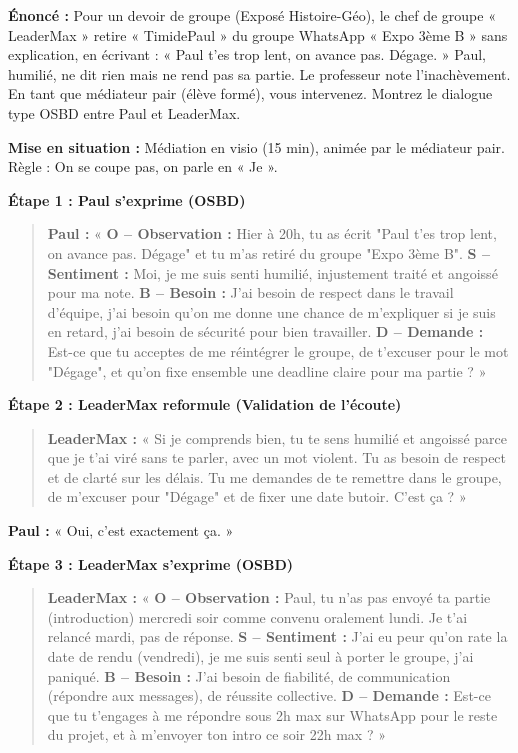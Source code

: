 \documentclass[11pt]{article}
\begin{document}
\begin{exoresolu}
\textbf{Énoncé :} Pour un devoir de groupe (Exposé Histoire-Géo), le chef de groupe « LeaderMax » retire « TimidePaul » du groupe WhatsApp « Expo 3ème B » sans explication, en écrivant : « Paul t'es trop lent, on avance pas. Dégage. » Paul, humilié, ne dit rien mais ne rend pas sa partie. Le professeur note l'inachèvement. En tant que médiateur pair (élève formé), vous intervenez. Montrez le dialogue type OSBD entre Paul et LeaderMax.

\tcblower
\textbf{Mise en situation :} Médiation en visio (15 min), animée par le médiateur pair. Règle : On se coupe pas, on parle en « Je ».

\textbf{Étape 1 : Paul s'exprime (OSBD)}
\begin{quote}
\textbf{Paul :} « \textbf{O -- Observation :} Hier à 20h, tu as écrit "Paul t'es trop lent, on avance pas. Dégage" et tu m'as retiré du groupe "Expo 3ème B". \textbf{S -- Sentiment :} Moi, je me suis senti humilié, injustement traité et angoissé pour ma note. \textbf{B -- Besoin :} J'ai besoin de respect dans le travail d'équipe, j'ai besoin qu'on me donne une chance de m'expliquer si je suis en retard, j'ai besoin de sécurité pour bien travailler. \textbf{D -- Demande :} Est-ce que tu acceptes de me réintégrer le groupe, de t'excuser pour le mot "Dégage", et qu'on fixe ensemble une deadline claire pour ma partie ? »
\end{quote}

\textbf{Étape 2 : LeaderMax reformule (Validation de l'écoute)}
\begin{quote}
\textbf{LeaderMax :} « Si je comprends bien, tu te sens humilié et angoissé parce que je t'ai viré sans te parler, avec un mot violent. Tu as besoin de respect et de clarté sur les délais. Tu me demandes de te remettre dans le groupe, de m'excuser pour "Dégage" et de fixer une date butoir. C'est ça ? »
\end{quote}
\textbf{Paul :} « Oui, c'est exactement ça. »

\textbf{Étape 3 : LeaderMax s'exprime (OSBD)}
\begin{quote}
\textbf{LeaderMax :} « \textbf{O -- Observation :} Paul, tu n'as pas envoyé ta partie (introduction) mercredi soir comme convenu oralement lundi. Je t'ai relancé mardi, pas de réponse. \textbf{S -- Sentiment :} J'ai eu peur qu'on rate la date de rendu (vendredi), je me suis senti seul à porter le groupe, j'ai paniqué. \textbf{B -- Besoin :} J'ai besoin de fiabilité, de communication (répondre aux messages), de réussite collective. \textbf{D -- Demande :} Est-ce que tu t'engages à me répondre sous 2h max sur WhatsApp pour le reste du projet, et à m'envoyer ton intro ce soir 22h max ? »
\end{quote}


\end{exoresolu}
\end{document}
